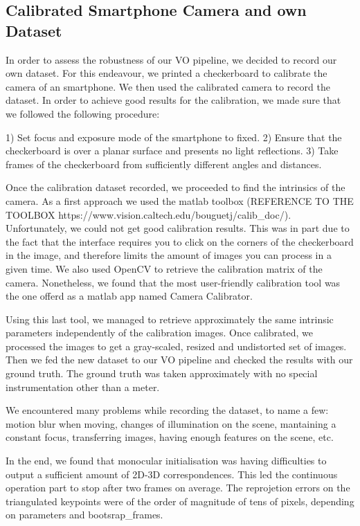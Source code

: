 \subsection{Calibrated Smartphone Camera and own Dataset}

In order to assess the robustness of our VO pipeline, we decided to record our own dataset.
For this endeavour, we printed a checkerboard to calibrate the camera of an smartphone.
We then used the calibrated camera to record the dataset.
In order to achieve good results for the calibration, we made sure that we followed the following procedure:

1) Set focus and exposure mode of the smartphone to fixed.
2) Ensure that the checkerboard is over a planar surface and presents no light reflections.
3) Take frames of the checkerboard from sufficiently different angles and distances.

Once the calibration dataset recorded, we proceeded to find the intrinsics of the camera.
As a first approach we used the matlab toolbox (REFERENCE TO THE TOOLBOX https://www.vision.caltech.edu/bouguetj/calib_doc/).
Unfortunately, we could not get good calibration results.
This was in part due to the fact that the interface requires you to click on the
corners of the checkerboard in the image, and therefore limits the amount of images you can process in a given time.
We also used OpenCV to retrieve the calibration matrix of the camera. Nonetheless, we found that the most user-friendly
calibration tool was the one offerd as a matlab app named Camera Calibrator.

Using this last tool, we managed to retrieve approximately the same intrinsic parameters independently of the calibration images.
Once calibrated, we processed the images to get a gray-scaled, resized and undistorted set of images. Then we fed the new
dataset to our VO pipeline and checked the results with our ground truth.
The ground truth was taken approximately with no special instrumentation other than a meter.

We encountered many problems while recording the dataset, to name a few: motion blur when moving, changes of illumination on the scene,
mantaining a constant focus, transferring images, having enough features on the scene, etc.

In the end, we found that monocular initialisation was having difficulties to output a sufficient amount of 2D-3D correspondences.
This led the continuous operation part to stop after two frames on average. The reprojetion errors on the triangulated keypoints were of
the order of magnitude of tens of pixels, depending on parameters and bootsrap_frames.

